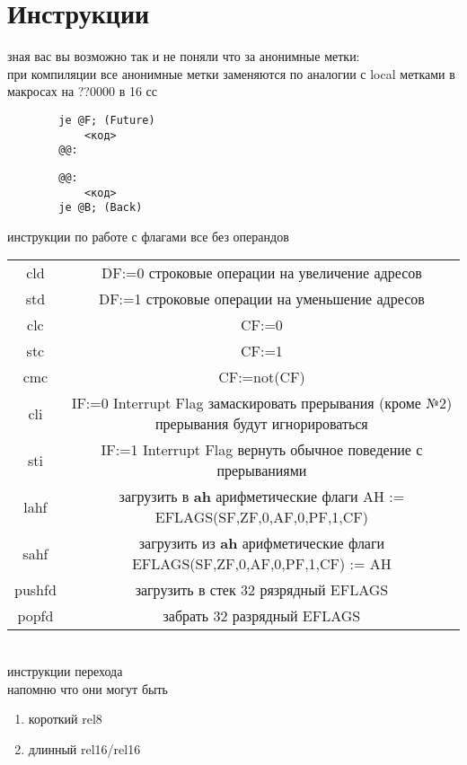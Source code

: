 \documentclass[a4paper,10pt]{article}
\begin{document}
\section*{Инструкции}
зная вас вы возможно так и не поняли что за анонимные метки: \\
при компиляции все анонимные метки заменяются по аналогии с local метками в макросах на ??0000 в 16 сс
\begin{multicols}{2}
    \begin{verbatim}
        je @F; (Future)
            <код>
        @@:
    \end{verbatim}
    \columnbreak
    \begin{verbatim}
        @@: 
            <код>
        je @B; (Back)
    \end{verbatim}
\end{multicols}
\vspace{0.5cm}
инструкции по работе с флагами все без операндов \\
\begin{tabular}{|c|c|}
    \hline
    cld & DF:=0 строковые операции на увеличение адресов \\
    std & DF:=1 строковые операции на уменьшение адресов \\
    clc & CF:=0 \\
    stc & CF:=1 \\
    cmc & CF:=not(CF) \\
    cli & IF:=0 Interrupt Flag замаскировать прерывания (кроме №2) прерывания будут игнорироваться \\
    sti & IF:=1 Interrupt Flag вернуть обычное поведение с прерываниями \\
    lahf & загрузить в \textbf{ah} арифметические флаги AH := EFLAGS(SF,ZF,0,AF,0,PF,1,CF)\\
    sahf & загрузить из \textbf{ah} арифметические флаги EFLAGS(SF,ZF,0,AF,0,PF,1,CF) := AH\\
    pushfd & загрузить в стек 32 рязрядный EFLAGS \\
    popfd & забрать 32 разрядный EFLAGS \\
    \hline
\end{tabular}
\vspace{1cm} \\
инструкции перехода \\
напомню что они могут быть
\begin{enumerate}
    \item короткий rel8
    \item длинный rel16/rel16
\end{enumerate}
\end{document}
